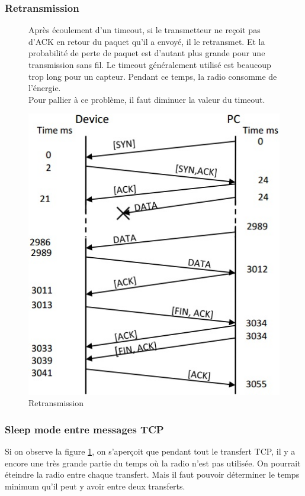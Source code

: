 \begin{frame}
 \frametitle{Retransmission}
 \begin{figure}
  \begin{minipage}[c]{.46\linewidth}
 Après écoulement d'un timeout, si le transmetteur ne reçoit pas d'ACK en retour du paquet qu'il a envoyé, il le retransmet. Et la probabilité de perte de paquet est d'autant plus grande pour une transmission sans fil.
 Le timeout généralement utilisé est beaucoup trop long pour un capteur. Pendant ce temps, la radio consomme de l'énergie.
 \vspace{3mm}\\
 Pour pallier à ce problème, il faut diminuer la valeur du timeout.
 \end{minipage}
 \begin{minipage}[c]{.46\linewidth}
  \includegraphics[scale=0.5]{figures/TCPretransmission.jpg}
  \caption{Retransmission}
  \label{retransmission}
  \end{minipage}
 \end{figure}
\end{frame}
\begin{frame}
 \frametitle{Sleep mode entre messages TCP}
 Si on observe la figure \ref{retransmission}, on s'aperçoit que pendant tout le transfert TCP, il y a encore une très grande partie du temps où la radio n'est pas utilisée.
 On pourrait éteindre la radio entre chaque transfert.
 Mais il faut pouvoir déterminer le temps minimum qu'il peut y avoir entre deux transferts.
\end{frame}

